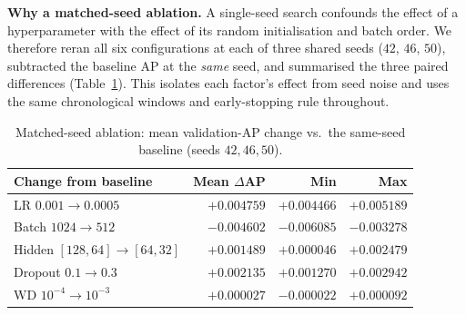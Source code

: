 \documentclass[conference]{IEEEtran}
\begin{document}
\begin{table}[!t]
  \caption{Selection search (one factor changed per trial; own seed).}
  \label{tab:search}
  \centering
  \setlength{\tabcolsep}{4pt}
\end{table}

\textbf{Why a matched-seed ablation.}
A single-seed search confounds the effect of a hyperparameter with the effect of
its random initialisation and batch order. We therefore reran all six
configurations at each of three shared seeds ($42$, $46$, $50$), subtracted the
baseline AP at the \emph{same} seed, and summarised the three paired differences
(Table~\ref{tab:ablation}). This isolates each factor's effect from seed noise
and uses the same chronological windows and early-stopping rule throughout.

\begin{table}[!t]
  \caption{Matched-seed ablation: mean validation-AP change vs.\ the same-seed
  baseline (seeds $42,46,50$).}
  \label{tab:ablation}
  \centering
  \setlength{\tabcolsep}{4pt}
  \begin{tabular}{lrrr}
    \toprule
    Change from baseline & Mean $\Delta$AP & Min & Max \\
    \midrule
    LR $0.001\!\rightarrow\!0.0005$      & $+0.004759$ & $+0.004466$ & $+0.005189$ \\
    Batch $1024\!\rightarrow\!512$       & $-0.004602$ & $-0.006085$ & $-0.003278$ \\
    Hidden $[128,64]\!\rightarrow\![64,32]$ & $+0.001489$ & $+0.000046$ & $+0.002479$ \\
    Dropout $0.1\!\rightarrow\!0.3$      & $+0.002135$ & $+0.001270$ & $+0.002942$ \\
    WD $10^{-4}\!\rightarrow\!10^{-3}$   & $+0.000027$ & $-0.000022$ & $+0.000092$ \\
    \bottomrule
  \end{tabular}
\end{table}
\end{document}
